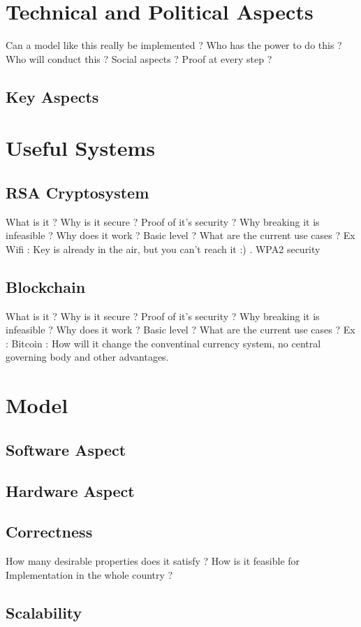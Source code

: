 \documentclass[12pt]{report}
\begin{document}
\chapter{Technical and Political Aspects}
Can a model like this really be implemented ? Who has the power to do this ? Who will conduct this ?
Social aspects ? Proof at every step ?
\section{Key Aspects}

\chapter{Useful Systems}
\section{RSA Cryptosystem}
What is it ? Why is it secure ? Proof of it's security ? Why breaking it is infeasible ? Why does it work ? Basic level ? What are the current use cases ?
Ex Wifi : Key is already in the air, but you can't reach it :) . WPA2 security 

\section{Blockchain}
What is it ? Why is it secure ? Proof of it's security ? Why breaking it is infeasible ? Why does it work ? Basic level ? What are the current use cases ?
Ex : Bitcoin : How will it change the conventinal currency system, no central governing body and other advantages.


\chapter{Model}

\section{Software Aspect}
\section{Hardware Aspect}
\section{Correctness}
How many desirable properties does it satisfy ? How is it feasible for Implementation in the whole country ?
\section{Scalability}
\end{document}
